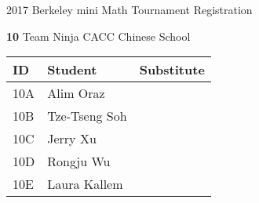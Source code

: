\documentclass[12pt]{amsart}
\begin{document}
\newpage



\renewcommand{\TeamID}{10}
\renewcommand{\TeamName}{Team Ninja}
\renewcommand{\SchoolName}{CACC Chinese School}
\renewcommand{\IDA}{10A}
\renewcommand{\IDB}{10B}
\renewcommand{\IDC}{10C}
\renewcommand{\IDD}{10D}
\renewcommand{\IDE}{10E}
\renewcommand{\StudentA}{Alim Oraz}
\renewcommand{\StudentB}{Tze-Tseng Soh}
\renewcommand{\StudentC}{Jerry Xu}
\renewcommand{\StudentD}{Rongju Wu}
\renewcommand{\StudentE}{Laura Kallem}

\begin{center}
{\sc \Large 2017 Berkeley mini Math Tournament Registration}

\bigskip
\bigskip

{\bf \Large  \TeamID} \hfill {\large \TeamName} \hfill {\large \SchoolName}

\bigskip
\bigskip

\begin{tabular}{| p{} | p{} | p{} |}
\hline
\bf ID         & \bf Student             & \bf Substitute             \\ \hline
\IDA           & \StudentA               &                            \\ \hline
\IDB           & \StudentB               &                            \\ \hline
\IDC           & \StudentC               &                            \\ \hline
\IDD           & \StudentD               &                            \\ \hline
\IDE           & \StudentE               &                            \\ \hline
\end{tabular} 
\end{center}
\bigskip
\bigskip

\newpage



\renewcommand{\TeamID}{11}
\renewcommand{\TeamName}{Cogito Academy}
\renewcommand{\SchoolName}{Cogito Academy}
\renewcommand{\IDA}{11A}
\renewcommand{\IDB}{}
\renewcommand{\IDC}{}
\renewcommand{\IDD}{}
\renewcommand{\IDE}{}
\renewcommand{\StudentA}{Jettae Schroff}
\renewcommand{\StudentB}{}
\renewcommand{\StudentC}{}
\renewcommand{\StudentD}{}
\renewcommand{\StudentE}{}
\end{document}
